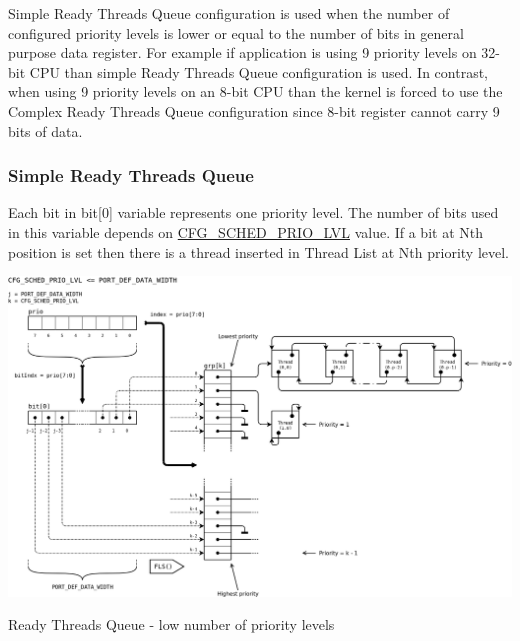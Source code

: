Simple Ready Threads Queue configuration is used when the number of configured priority levels is lower or equal to the number of bits in general purpose data register. For example if application is using 9 priority levels on 32-\/bit C\-P\-U than simple Ready Threads Queue configuration is used. In contrast, when using 9 priority levels on an 8-\/bit C\-P\-U than the kernel is forced to use the Complex Ready Threads Queue configuration since 8-\/bit register cannot carry 9 bits of data.\hypertarget{scheduler_sched_rdyThdQ_simple}{}\subsubsection{Simple Ready Threads Queue}\label{scheduler_sched_rdyThdQ_simple}
Each bit in {\ttfamily bit\mbox{[}0\mbox{]}} variable represents one priority level. The number of bits used in this variable depends on \hyperlink{group__template__kern__cfg_ga56bd89fe76f7fe22f3d8805bc3c68892}{C\-F\-G\-\_\-\-S\-C\-H\-E\-D\-\_\-\-P\-R\-I\-O\-\_\-\-L\-V\-L} value. If a bit at {\ttfamily Nth} position is set then there is a thread inserted in Thread List at {\ttfamily Nth} priority level.

\par

\begin{DoxyImage}
\includegraphics[width=15cm]{thdQ-simple.png}
\caption{Ready Threads Queue -\/ low number of priority levels}
\end{DoxyImage}


